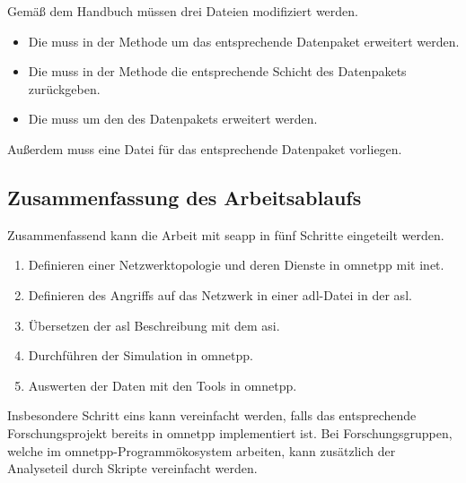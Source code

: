 Gemäß dem Handbuch müssen drei Dateien modifiziert werden.
\begin{itemize}
	\item Die  muss in der Methode  um das entsprechende Datenpaket erweitert werden. 
	\item Die  muss in der Methode  die entsprechende Schicht des Datenpakets zurückgeben.
	\item Die  muss um den  des Datenpakets erweitert werden.
\end{itemize}
Außerdem muss eine  Datei für das entsprechende Datenpaket vorliegen.

\subsection{Zusammenfassung des Arbeitsablaufs}
Zusammenfassend kann die Arbeit mit \gls{seapp} in fünf Schritte eingeteilt werden.
\begin{enumerate}
	\item Definieren einer Netzwerktopologie und deren Dienste in \gls{omnetpp} mit \gls{inet}.
	\item Definieren des Angriffs auf das Netzwerk in einer \gls{adl}-Datei in der \gls{asl}.
	\item Übersetzen der \gls{asl} Beschreibung mit dem \gls{asi}.
	\item Durchführen der Simulation in \gls{omnetpp}.
	\item Auswerten der Daten mit den Tools in \gls{omnetpp}.
\end{enumerate}
Insbesondere Schritt eins kann vereinfacht werden, falls das entsprechende Forschungsprojekt bereits in \gls{omnetpp} implementiert ist. Bei Forschungsgruppen, welche im \gls{omnetpp}-Programmökosystem arbeiten, kann zusätzlich der Analyseteil durch Skripte vereinfacht werden.